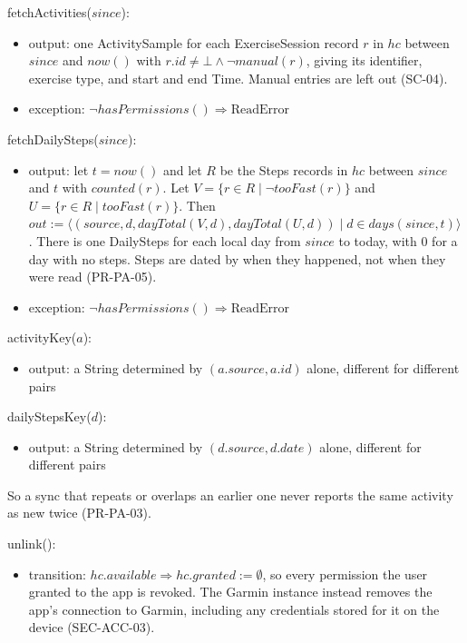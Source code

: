 \documentclass[12pt, titlepage]{article}
\begin{document}
\noindent fetchActivities($\mathit{since}$):
\begin{itemize}
\item output: one ActivitySample for each ExerciseSession record $r$ in
  $\mathit{hc}$ between $\mathit{since}$ and $\mathit{now}()$ with
  $r.\mathit{id} \neq \bot \land \lnot \mathit{manual}(r)$, giving its
  identifier, exercise type, and start and end Time. Manual entries are left
  out (SC-04).
\item exception: $\lnot \mathit{hasPermissions}() \Rightarrow
  \mathrm{ReadError}$
\end{itemize}

\noindent fetchDailySteps($\mathit{since}$):
\begin{itemize}
\item output: let $t = \mathit{now}()$ and let $R$ be the Steps records in
  $\mathit{hc}$ between $\mathit{since}$ and $t$ with $\mathit{counted}(r)$.
  Let $V = \{r \in R \mid \lnot \mathit{tooFast}(r)\}$ and $U = \{r \in R
  \mid \mathit{tooFast}(r)\}$. Then $\mathit{out} := \langle
  (\mathit{source}, d, \mathit{dayTotal}(V, d), \mathit{dayTotal}(U, d))
  \mid d \in \mathit{days}(\mathit{since}, t) \rangle$. There is one
  DailySteps for each local day from $\mathit{since}$ to today, with 0 for a
  day with no steps. Steps are dated by when they happened, not when they
  were read (PR-PA-05).
\item exception: $\lnot \mathit{hasPermissions}() \Rightarrow
  \mathrm{ReadError}$
\end{itemize}

\noindent activityKey($a$):
\begin{itemize}
\item output: a String determined by $(a.\mathit{source}, a.\mathit{id})$
  alone, different for different pairs
\end{itemize}

\noindent dailyStepsKey($d$):
\begin{itemize}
\item output: a String determined by $(d.\mathit{source}, d.\mathit{date})$
  alone, different for different pairs
\end{itemize}

\noindent So a sync that repeats or overlaps an earlier one never reports the
same activity as new twice (PR-PA-03).

\medskip

\noindent unlink():
\begin{itemize}
\item transition: $\mathit{hc}.\mathit{available} \Rightarrow
  \mathit{hc}.\mathit{granted} := \emptyset$, so every permission the user
  granted to the app is revoked. The Garmin instance instead removes the
  app's connection to Garmin, including any credentials stored for it on the
  device (SEC-ACC-03).
\end{itemize}
\end{document}
